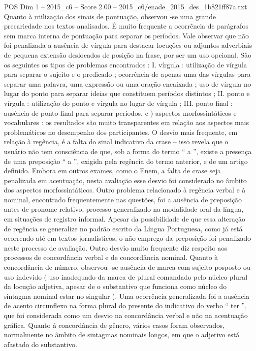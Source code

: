 \begin{textsample}{POS Dim 1 – 2015\_c6 – Score 2.00 – 2015\_c6/enade\_2015\_des\_1b821ff87a.txt}
Quanto à utilização dos sinais de pontuação, observou -se uma grande precariedade nos textos analisados.
É muito frequente a ocorrência de parágrafos sem marca interna de pontuação para separar os períodos.
Vale observar que não foi penalizada a ausência de vírgula para destacar locuções ou adjuntos adverbiais de pequena extensão deslocados de posição na frase, por ser um uso opcional.
São os seguintes os tipos de problemas encontrados : I. vírgula : utilização de vírgula para separar o sujeito e o predicado ; ocorrência de apenas uma das vírgulas para separar uma palavra, uma expressão ou uma oração encaixada ; uso de vírgula no lugar do ponto para separar ideias que constituem períodos distintos ; II. ponto e vírgula : utilização do ponto e vírgula no lugar de vírgula ; III. ponto final : ausência de ponto final para separar períodos. c ) aspectos morfossintáticos e vocabulares : os resultados são muito transparentes em relação aos aspectos mais problemáticos no desempenho dos participantes.
O desvio mais frequente, em relação à regência, é a falta do sinal indicativo da crase – isso revela que o usuário não tem consciência de que, sob a forma do termo “ a ”, existe a presença de uma preposição “ a ”, exigida pela regência do termo anterior, e de um artigo definido.
Embora em outros exames, como o Enem, a falta de crase seja penalizada em acentuação, nesta avaliação esse desvio foi considerado no âmbito dos aspectos morfossintáticos.
Outro problema relacionado à regência verbal e à nominal, encontrado frequentemente nas questões, foi a ausência de preposição antes de pronome relativo, processo generalizado na modalidade oral da língua, em situações de registro informal.
Apesar da possibilidade de que essa alteração de regência se generalize no padrão escrito da Língua Portuguesa, como já está ocorrendo até em textos jornalísticos, o não emprego da preposição foi penalizado neste processo de avaliação.
Outro desvio muito frequente diz respeito aos processos de concordância verbal e de concordância nominal.
Quanto à concordância de número, observou -se ausência de marca com sujeito posposto ou uso indevido ( uso inadequado da marca de plural comandado pelo núcleo plural da locução adjetiva, apesar de o substantivo que funciona como núcleo do sintagma nominal estar no singular ).
Uma ocorrência generalizada foi a ausência de acento circunflexo na forma plural do presente do indicativo do verbo “ ter ”, que foi considerada como um desvio na concordância verbal e não na acentuação gráfica.
Quanto à concordância de gênero, vários casos foram observados, normalmente no âmbito de sintagmas nominais longos, em que o adjetivo está afastado do substantivo.

\end{textsample}
